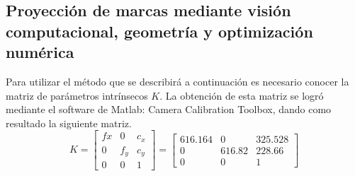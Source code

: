               \subsection{Proyección de marcas mediante visión computacional, geometría y optimización numérica}
              Para utilizar el método que se describirá a continuación es necesario conocer la matriz de parámetros intrínsecos $K$. La obtención de esta matriz se logró mediante el software de Matlab: Camera Calibration Toolbox, dando como resultado la siguiente matriz.
              \[K=
              \begin{bmatrix}
              fx & 0 & c_x\\
              0 & f_y & c_y\\
              0 & 0 & 1
              \end{bmatrix}
              =
              \begin{bmatrix}
              616.164 & 0 & 325.528\\
              0 & 616.82 & 228.66\\
              0 & 0 & 1
              \end{bmatrix}
              \]
